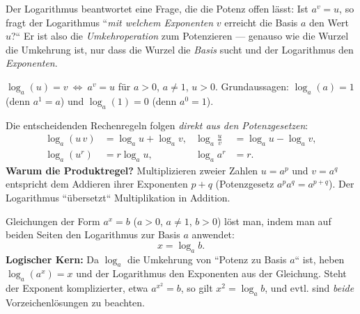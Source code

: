 


Der Logarithmus beantwortet eine Frage, die die Potenz offen lässt: Ist
$a^v=u$, so fragt der Logarithmus ``\emph{mit welchem Exponenten} $v$
erreicht die Basis $a$ den Wert $u$?`` Er ist also die
\emph{Umkehroperation} zum Potenzieren --- genauso wie die Wurzel die
Umkehrung ist, nur dass die Wurzel die \emph{Basis} sucht und der
Logarithmus den \emph{Exponenten}.

\begin{werkzeugkasten}
$\log_a(u)=v \ \Longleftrightarrow\ a^v=u$ für $a>0$, $a\neq1$, $u>0$.
Grundaussagen: $\log_a(a)=1$ (denn $a^1=a$) und $\log_a(1)=0$ (denn
$a^0=1$).

Die entscheidenden Rechenregeln folgen \emph{direkt aus den
Potenzgesetzen}:
\begin{align}
  \log_a(u\,v)&=\log_a u+\log_a v, &
  \log_a\frac{u}{v}&=\log_a u-\log_a v,\\
  \log_a(u^r)&=r\log_a u, &
  \log_a a^r&=r .
\end{align}
\textbf{Warum die Produktregel?} Multiplizieren zweier Zahlen $u=a^p$ und
$v=a^q$ entspricht dem Addieren ihrer Exponenten $p+q$ (Potenzgesetz
$a^pa^q=a^{p+q}$). Der Logarithmus ``übersetzt`` Multiplikation in
Addition.
\end{werkzeugkasten}

\begin{werkzeugkasten}
Gleichungen der Form $a^x=b$ ($a>0$, $a\neq1$, $b>0$) löst man, indem man
auf beiden Seiten den Logarithmus zur Basis $a$ anwendet:
\begin{equation}
  x=\log_a b .
\end{equation}
\textbf{Logischer Kern:} Da $\log_a$ die Umkehrung von ``Potenz zu Basis
$a$`` ist, heben $\log_a(a^x)=x$ und der Logarithmus den Exponenten aus
der Gleichung. Steht der Exponent komplizierter, etwa $a^{x^2}=b$, so gilt
$x^2=\log_a b$, und evtl. sind \emph{beide} Vorzeichenlösungen zu
beachten.
\end{werkzeugkasten}

